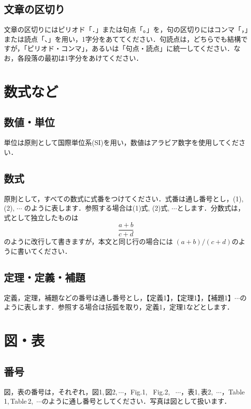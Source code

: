 \documentclass{hisken}
\begin{document}
\subsection{文章の区切り}
文章の区切りにはピリオド「．」または句点「。」を，句の区切りにはコンマ「，」または読点「、」を用い，1字分をあててください．句読点は，どちらでも結構ですが，「ピリオド・コンマ」，あるいは「句点・読点」に統一してください．なお，各段落の最初は1字分をあけてください．


\section{数式など}

\subsection{数値・単位}
単位は原則として国際単位系(SI)を用い，数値はアラビア数字を使用してください．

\subsection{数式}
原則として，すべての数式に式番をつけてください．式番は通し番号とし，(1), (2), $ \cdots $ のように表します．参照する場合は(1)式, (2)式, $ \cdots $とします．分数式は，式として独立したものは
\begin{equation}
	\frac{a+b}{c+d}
	\label{formula}
\end{equation}
のように改行して書きますが，本文と同じ行の場合には $ (a+b) / (c+d) $のように書いてください．

\subsection{定理・定義・補題}
定義，定理，補題などの番号は通し番号とし，【定義1】，【定理1】，【補題1】$ \cdots $のように表します．参照する場合は括弧を取り，定義1，定理1などとします．


\section{図・表}

\subsection{番号}
図，表の番号は，それぞれ，図1,\,図2,\,$ \cdots $，Fig.1, \, Fig.2, \, $ \cdots $，表1,\,表2,\, $ \cdots $，Table\,1,\,Table\,2,\, $ \cdots $のように通し番号としてください．写真は図として扱います．
\end{document}
